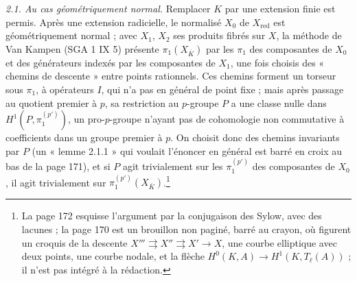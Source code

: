\documentclass[11pt,a4paper]{article}
\begin{document}
\emph{2.1. Au cas géométriquement normal.} Remplacer $K$ par une extension finie
est permis. Après une extension radicielle, le normalisé $X_0$ de
$X_{\mathrm{red}}$ est géométriquement normal ; avec $X_1$, $X_2$ ses produits
fibrés sur $X$, la méthode de Van Kampen (SGA 1 IX 5) présente
$\pi_1(X_{\overline K})$ par les $\pi_1$ des composantes de $X_0$ et des
générateurs indexés par les composantes de $X_1$, une fois choisis des
« chemins de descente » entre points rationnels. Ces chemins forment un torseur
sous $\pi_1$, à opérateurs $I$, qui n'a pas en général de point fixe ; mais
après passage au quotient premier à $p$, sa restriction au $p$-groupe $P$ a une
classe nulle dans $H^1(P, \pi_1^{(p')})$, un pro-$p$-groupe n'ayant pas de
cohomologie non commutative à coefficients dans un groupe premier à $p$. On
choisit donc des chemins invariants par $P$ (un « lemme 2.1.1 » qui voulait
l'énoncer en général est barré en croix au bas de la page 171), et si $P$ agit trivialement sur les
$\pi_1^{(p')}$ des composantes de $X_0$, il agit trivialement sur
$\pi_1^{(p')}(X_{\overline K})$.\footnote{La page 172 esquisse l'argument par la
conjugaison des Sylow, avec des lacunes ; la page 170 est un brouillon non
paginé, barré au crayon, où figurent un croquis de la descente
$X''' \rightrightarrows X'' \rightrightarrows X' \to X$, une courbe elliptique
avec deux points, une courbe nodale, et la flèche
$H^0(K, A) \to H^1(K, T_\ell(A))$ ; il n'est pas intégré à la rédaction.}

\begin{center}
\end{center}

\end{document}
